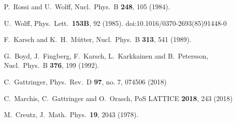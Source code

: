\documentclass{PoS}
\begin{document}
\begin{thebibliography}{99}

  P.~Rossi and U.~Wolff,
  Nucl.\ Phys.\ B {\bf 248}, 105 (1984).
  
  U.~Wolff,
  Phys.\ Lett.\  {\bf 153B}, 92 (1985).
  doi:10.1016/0370-2693(85)91448-0

  F.~Karsch and K.~H.~M\"utter,
  Nucl.\ Phys.\ B {\bf 313}, 541 (1989).

  G.~Boyd, J.~Fingberg, F.~Karsch, L.~Karkkainen and B.~Petersson,
  Nucl.\ Phys.\ B {\bf 376}, 199 (1992).
  
  C.~Gattringer,
  Phys.\ Rev.\ D {\bf 97}, no. 7, 074506 (2018)
  
  C.~Marchis, C.~Gattringer and O.~Orasch,
  PoS LATTICE {\bf 2018}, 243 (2018)
  
  M.~Creutz,
  J.\ Math.\ Phys.\  {\bf 19}, 2043 (1978).
  

\end{thebibliography}
\end{document}
